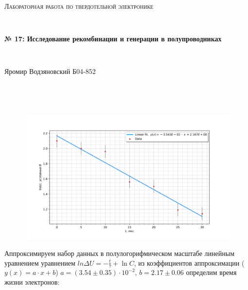 \documentclass[a4paper]{article}
\begin{document}
\graphicspath{ {pictures/} }
\begin{center}
    {\scshape\Large Лабораторная работа по твердотельной электронике} \par

    \

    {\huge\bfseries № 17: Исследование рекомбинации и генерации в полупроводниках} \par 

    \

    {\large Яромир Водзяновский Б04-852}
\end{center}

\

\

\begin{figure}[H]
    \begin{center}
        \includegraphics[scale = 0.7]{graph.png}
        \caption{}
        \label{}
    \end{center}
\end{figure}

Аппроксимируем набор данных в полулогорифмическом масштабе линейным уравнением уравнением $ln{\Delta U} = -\frac{t}{\tau} + \ln{C}$, из коэффициентов аппроксимации ($y(x) = a\cdot x + b$) $a = (3.54 \pm 0.35)\cdot 10^{-2}$, $b = 2.17 \pm 0.06$ определим 
время жизни электронов:

\begin{center}
\end{center}

	
\end{document}
